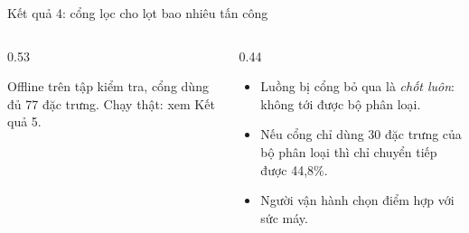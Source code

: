 \documentclass[aspectratio=169, 11pt]{beamer}
\begin{document}
\begin{frame}{Kết quả 4: cổng lọc cho lọt bao nhiêu tấn công}
  \begin{columns}[T]
    \begin{column}{0.53\textwidth}
      \centering\small
      \\[0.3em]
      \raggedright\scriptsize Offline trên tập kiểm tra, cổng dùng đủ 77 đặc
      trưng. Chạy thật: xem Kết quả 5.
    \end{column}
    \begin{column}{0.44\textwidth}
      \begin{itemize}\small
        \setlength{\itemsep}{0.4em}
        \item Luồng bị cổng bỏ qua là \emph{chốt luôn}:  không tới được bộ phân loại.
        \item Nếu cổng chỉ dùng 30 đặc trưng của bộ phân loại thì chỉ chuyển
              tiếp được 44,8\%.
        \item Người vận hành chọn điểm hợp với sức máy.
      \end{itemize}
    \end{column}
  \end{columns}
\end{frame}
\end{document}
